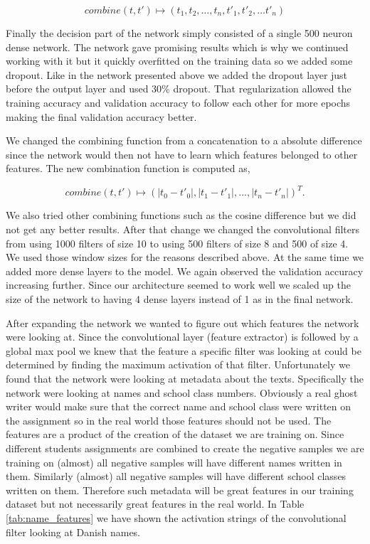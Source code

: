 \begin{equation}
    combine(t, t') \mapsto (t_1, t_2, \dots, t_n, t'_1, t'_2, \dots t'_n)
\end{equation}

Finally the decision part of the network simply consisted of a single 500 neuron
dense network. The network gave promising results which is why we continued
working with it but it quickly overfitted on the training data so we added some
dropout. Like in the network presented above we added the dropout layer just
before the output layer and used 30\% dropout. That regularization allowed the
training accuracy and validation accuracy to follow each other for more epochs
making the final validation accuracy better.

We changed the combining function from a concatenation to a absolute difference
since the network would then not have to learn which features belonged to other
features. The new combination function is computed as,

\begin{equation}\label{eq:abs}
    combine(t, t') \mapsto \left(
        |t_0 - t'_0|, |t_1 - t'_1|, \dots, |t_n - t'_n|
    \right)^T.
\end{equation}

We also tried other combining functions such as the cosine difference but we
did not get any better results. After that change we changed the convolutional
filters from using 1000 filters of size 10 to using 500 filters of size 8 and
500 of size 4. We used those window sizes for the reasons described above. At
the same time we added more dense layers to the model. We again observed the
validation accuracy increasing further. Since our architecture seemed to work
well we scaled up the size of the network to having 4 dense layers instead of 1
as in the final network.

After expanding the network we wanted to figure out which features the network
were looking at. Since the convolutional layer (feature extractor) is followed
by a global max pool we knew that the feature a specific filter was looking
at could be determined by finding the maximum activation of that filter.
Unfortunately we found that the network were looking at metadata about the
texts. Specifically the network were looking at names and school class numbers.
Obviously a real ghost writer would make sure that the correct name and school
class were written on the assignment so in the real world those features should
not be used. The features are a product of the creation of the dataset we are
training on. Since different students assignments are combined to create the
negative samples we are training on (almost) all negative samples will have
different names written in them. Similarly (almost) all negative samples will
have different school classes written on them. Therefore such metadata will be
great features in our training dataset but not necessarily great features in
the real world. In Table \ref{tab:name_features} we have shown the activation
strings of the convolutional filter looking at Danish names.

